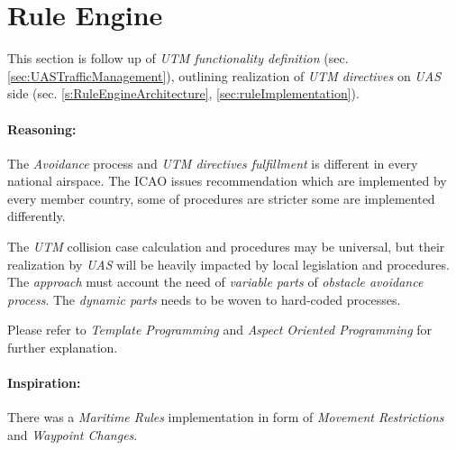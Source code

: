 \section{Rule Engine}\label{sec:ruleEngine}

\noindent This section is follow up of \emph{UTM functionality definition} (sec. \ref{sec:UASTrafficManagement}), outlining realization of \emph{UTM directives} on \emph{UAS} side (sec. \ref{s:RuleEngineArchitecture},  \ref{sec:ruleImplementation}).

\paragraph{Reasoning:} The \emph{Avoidance} process and \emph{UTM directives fulfillment} is different in every national airspace. The ICAO issues recommendation \cite{icao4444,icaoAnnex2} which are implemented by every member country, some of procedures are stricter some are implemented differently.

The \emph{UTM} collision case calculation and procedures may be universal, but their realization by \emph{UAS} will be heavily impacted by local legislation and procedures.  The \emph{approach} must account the need of \emph{variable parts} of \emph{obstacle avoidance process}. The \emph{dynamic parts} needs to be woven to hard-coded processes. 

\begin{note}
	Please refer to \emph{Template Programming} and \emph{Aspect Oriented Programming} for further explanation.
\end{note}

\paragraph{Inspiration:} There was a \emph{Maritime Rules} implementation \cite{benjamin2006navigation} in form of \emph{Movement Restrictions} and \emph{Waypoint Changes}.
